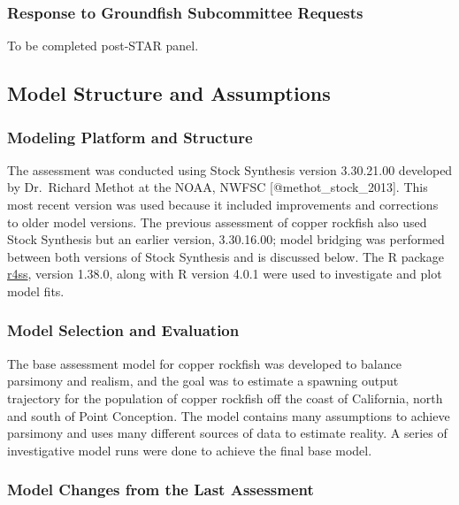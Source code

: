 \documentclass[11pt,
  letterpaper,
]{article}
\begin{document}
\subsubsection{Response to Groundfish Subcommittee Requests}\label{response-to-groundfish-subcommittee-requests}

To be completed post-STAR panel.

\subsection{Model Structure and Assumptions}\label{model-structure-and-assumptions}

\subsubsection{Modeling Platform and Structure}\label{modeling-platform-and-structure}

The assessment was conducted using Stock Synthesis version 3.30.21.00 developed by Dr.~Richard Methot at the NOAA, NWFSC {[}@methot\_stock\_2013{]}. This most recent version was used because it included improvements and corrections to older model versions. The previous assessment of copper rockfish also used Stock Synthesis but an earlier version, 3.30.16.00; model bridging was performed between both versions of Stock Synthesis and is discussed below. The R package \href{https://github.com/r4ss/r4ss}{r4ss}, version 1.38.0, along with R version 4.0.1 were used to investigate and plot model fits.

\subsubsection{Model Selection and Evaluation}\label{model-selection-and-evaluation}

The base assessment model for copper rockfish was developed to balance parsimony and realism, and the goal was to estimate a spawning output trajectory for the population of copper rockfish off the coast of California, north and south of Point Conception. The model contains many assumptions to achieve parsimony and uses many different sources of data to estimate reality. A series of investigative model runs were done to achieve the final base model.

\subsubsection{Model Changes from the Last Assessment}\label{model-changes-from-the-last-assessment}
\end{document}
